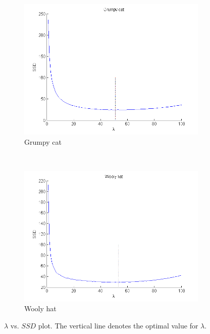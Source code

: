 \documentclass{paper}
\begin{document}
\begin{figure}[ht]
\centering
\begin{subfigure}[h]{0.45\textwidth}
	\centering
	\includegraphics[width=\textwidth]{lambdaVSssd-iter1000-alpha0_01-grumpycat}
	\caption*{Grumpy cat}
\end{subfigure}
~
\begin{subfigure}[h]{0.45\textwidth}
	\centering
	\includegraphics[width=\textwidth]{lambdaVSssd-iter1000-alpha0_01-woolyhat}
	\caption*{Wooly hat}
\end{subfigure}
\caption{$\lambda$ vs. $SSD$ plot. The vertical line denotes the optimal value for $\lambda$.}
\label{fig:optimal-lambda-plots}
\end{figure}
\end{document}

